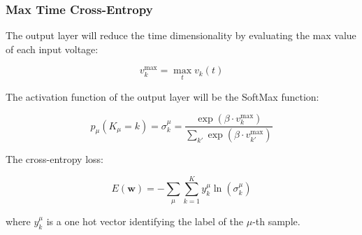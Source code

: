 \subsubsection{Max Time Cross-Entropy} \label{ch:max_time_cross_entropy}

The output layer will reduce the time dimensionality by evaluating the max value of each input voltage:

\begin{equation}
    v_k^{\text{max}} = \max_{t} v_k(t)
\end{equation}

The activation function of the output layer will be the SoftMax function:

\begin{equation}
    p_{\mu}(K_{\mu}=k) = \sigma_k^{\mu} = \frac{\exp(\beta \cdot v_k^{\text{max}})}{\sum_{k'} \exp(\beta \cdot v_{k'}^{\text{max}})}
\end{equation}

The cross-entropy loss:

\begin{equation}
    E(\mathbf{w}) = -\sum_{\mu} \sum_{k=1}^K y_k^{\mu} \ln(\sigma_k^{\mu})
\end{equation}

where \( y_k^{\mu} \) is a one hot vector identifying the label of the \(\mu\)-th sample.
